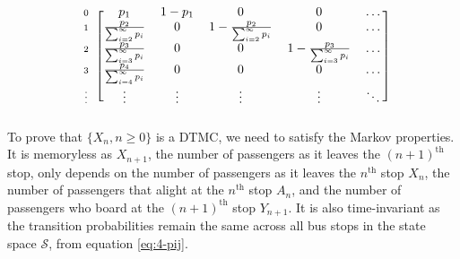 \documentclass[12pt]{article}
\newcommand{\matindex}[1]{\mbox{\scriptsize#1}}%
\begin{document}
\begin{equation}
\begin{blockarray}{cccccc}
\begin{block}{c[ccccc]}
                    \matindex{0} & p_{1} & 1-p_{1} & 0 & 0 & \dots \\ 
                    \matindex{1} & \frac{p_{2}}{ \sum_{i=2}^{\infty} p_i} & 0 & 1-\frac{p_{2}}{ \sum_{i=2}^{\infty} p_i} & 0 & \dots \\ 
                    \matindex{2} & \frac{p_{3}}{ \sum_{i=3}^{\infty} p_i} & 0 & 0 & 1-\frac{p_{3}}{ \sum_{i=3}^{\infty} p_i} & \dots \\ 
                    \matindex{3} & \frac{p_{4}}{ \sum_{i=4}^{\infty} p_i} & 0 & 0 & 0 & \dots \\ 
                    \matindex{\vdots} & \vdots & \vdots & \vdots & \vdots & \ddots \\
                \end{block}
            \end{blockarray}
\end{equation} To prove that $\{X_n, n \geq 0\}$ is a DTMC, we need to satisfy the Markov properties. It is memoryless as $X_{n+1}$, the number of passengers as it leaves the $(n+1)^{\text{th}}$ stop, only depends on the number of passengers as it leaves the $n^{\text{th}}$ stop $X_n$, the number of passengers that alight at the $n^{\text{th}}$ stop $A_n$, and the number of passengers who board at the $(n+1)^{\text{th}}$ stop $Y_{n+1}$. It is also time-invariant as the transition probabilities remain the same across all bus stops in the state space $\mathcal{S}$, from equation \ref{eq:4-pij}. 


% 

\end{document}

